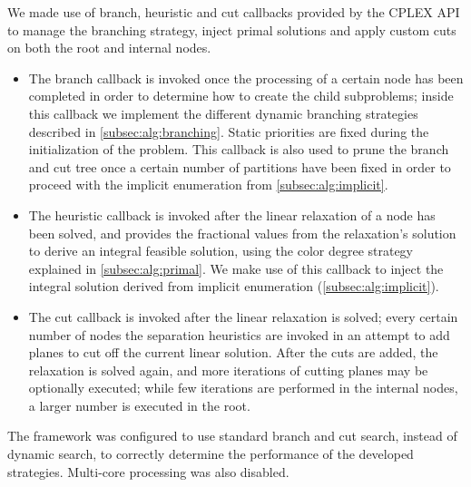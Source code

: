 We made use of branch, heuristic and cut callbacks provided by the CPLEX API to manage the branching strategy, inject primal solutions and apply custom cuts on both the root and internal nodes.
\begin{itemize}
\item{The branch callback is invoked once the processing of a certain node has been completed in order to determine how to create the child subproblems; inside this callback we implement the different dynamic branching strategies described in \ref{subsec:alg:branching}. Static priorities are fixed during the initialization of the problem. This callback is also used to prune the branch and cut tree once a certain number of partitions have been fixed in order to proceed with the implicit enumeration from \ref{subsec:alg:implicit}.}
\item{The heuristic callback is invoked after the linear relaxation of a node has been solved, and provides the fractional values from the relaxation's solution to derive an integral feasible solution, using the color degree strategy explained in \ref{subsec:alg:primal}. We make use of this callback to inject the integral solution derived from implicit enumeration (\ref{subsec:alg:implicit}).}
\item{The cut callback is invoked after the linear relaxation is solved; every certain number of nodes the separation heuristics are invoked in an attempt to add planes to cut off the current linear solution. After the cuts are added, the relaxation is solved again, and more iterations of cutting planes may be optionally executed; while few iterations are performed in the internal nodes, a larger number is executed in the root.}
\end{itemize} 

The framework was configured to use standard branch and cut search, instead of dynamic search, to correctly determine the performance of the developed strategies. Multi-core processing was also disabled.
